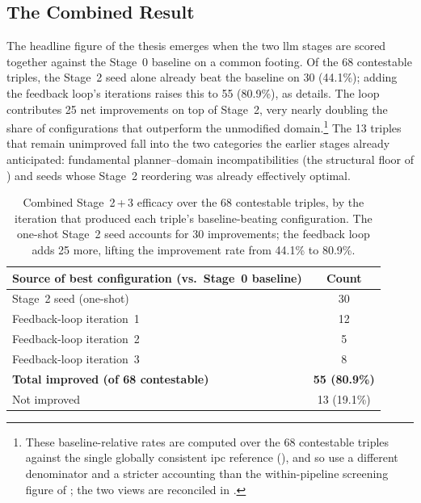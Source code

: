 \subsection{The Combined Result}
\label{sec:results:stage3:combined}

The headline figure of the thesis emerges when the two \gls{llm} stages are scored together against the Stage~0 baseline on a common footing.
Of the 68 contestable triples, the Stage~2 seed alone already beat the baseline on 30 (44.1\%); adding the feedback loop's iterations raises this to 55 (80.9\%), as  details.
The loop contributes 25 net improvements on top of Stage~2, very nearly doubling the share of configurations that outperform the unmodified domain.\footnote{These baseline-relative rates are computed over the 68 contestable triples against the single globally consistent \gls{ipc} reference (), and so use a different denominator and a stricter accounting than the within-pipeline screening figure of ; the two views are reconciled in .}
The 13 triples that remain unimproved fall into the two categories the earlier stages already anticipated: fundamental planner--domain incompatibilities (the structural floor of ) and seeds whose Stage~2 reordering was already effectively optimal.

\begin{table}[htbp]
  \centering
  \caption{Combined Stage~2\,+\,3 efficacy over the 68 contestable triples, by the iteration that produced each triple's baseline-beating configuration. The one-shot Stage~2 seed accounts for 30 improvements; the feedback loop adds 25 more, lifting the improvement rate from 44.1\% to 80.9\%.}
  \label{tab:s3_combined}
  \small
  \begin{tabular}{l c}
    \toprule
    \textbf{Source of best configuration (vs.\ Stage~0 baseline)} & \textbf{Count} \\
    \midrule
    Stage~2 seed (one-shot)        & 30 \\
    Feedback-loop iteration~1      & 12 \\
    Feedback-loop iteration~2      & 5  \\
    Feedback-loop iteration~3      & 8  \\
    \midrule
    \textbf{Total improved (of 68 contestable)} & \textbf{55 (80.9\%)} \\
    Not improved                   & 13 (19.1\%) \\
    \bottomrule
  \end{tabular}
\end{table}

